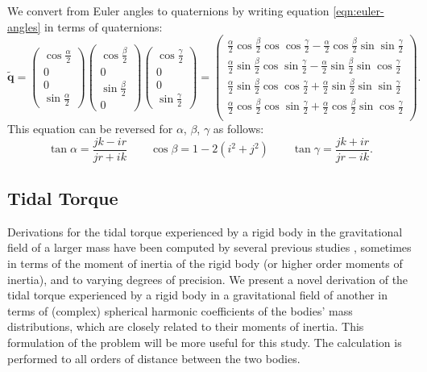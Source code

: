 \documentclass{aastex631}
\newcommand{\parens}[1]{\left( #1 \right)}
\newcommand{\quat}[1]{\widetilde{\bm{#1}}}
\begin{document}
We convert from Euler angles to quaternions by writing equation \ref{eqn:euler-angles} in terms of quaternions:
\begin{equation}
\quat q = \parens{\begin{array}{c} \cos \frac{\alpha}{2} \\ 0\\ 0 \\\sin \frac{\alpha}{2}\end{array}}
\parens{\begin{array}{c} \cos \frac{\beta}{2} \\ 0 \\\sin \frac{\beta}{2}\\ 0\end{array}}
\parens{\begin{array}{c} \cos \frac{\gamma}{2} \\ 0\\ 0 \\\sin \frac{\gamma}{2}\end{array}} = \parens{\begin{array}{c}
\frac{\alpha}{2} \cos \frac{\beta}{2} \cos  \cos \frac{\gamma}{2} - \frac{\alpha}{2} \cos \frac{\beta}{2}\sin \sin \frac{\gamma}{2}\\
\frac{\alpha}{2} \sin \frac{\beta}{2} \cos  \sin \frac{\gamma}{2} - \frac{\alpha}{2} \sin \frac{\beta}{2}\sin \cos \frac{\gamma}{2}\\
\frac{\alpha}{2} \sin \frac{\beta}{2} \cos  \cos \frac{\gamma}{2} + \frac{\alpha}{2} \sin \frac{\beta}{2}\sin \sin \frac{\gamma}{2}\\
\frac{\alpha}{2} \cos \frac{\beta}{2} \cos  \sin \frac{\gamma}{2} + \frac{\alpha}{2} \cos \frac{\beta}{2}\sin \cos \frac{\gamma}{2}\\
\end{array}}.
\label{eqn:euler-to-quat}
\end{equation}
This equation can be reversed for $\alpha$, $\beta$, $\gamma$ as follows:
\begin{equation}
\tan \alpha = \frac{jk - ir}{jr + ik}\qquad \cos \beta = 1 - 2(i^2 + j^2) \qquad \tan \gamma = \frac{jk + ir}{jr - ik} .
\label{eqn:quat-to-euler}
\end{equation}



\subsection{Tidal Torque}
Derivations for the tidal torque experienced by a rigid body in the gravitational field of a larger mass have been computed by several previous studies \cite{paul88,HouMar2017,BOUE2009750, ashenberg07}, sometimes in terms of the moment of inertia of the rigid body (or higher order moments of inertia), and to varying degrees of precision. We present a novel derivation of the tidal torque experienced by a rigid body in a gravitational field of another in terms of (complex) spherical harmonic coefficients of the bodies' mass distributions, which are closely related to their moments of inertia. This formulation of the problem will be more useful for this study. The calculation is performed to all orders of distance between the two bodies.
\end{document}
